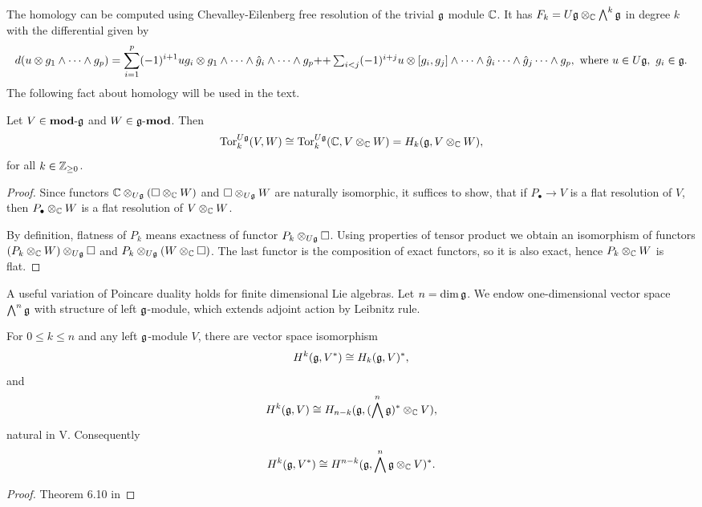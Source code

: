 The homology can be computed using Chevalley-Eilenberg  free
resolution of the trivial $\mathfrak{g}$ module $\mathbb{C}$. It has $F_k=U\mathfrak{g}\otimes_{\mathbb{C}} \bigwedge^k
\mathfrak{g}$ in degree $k$ with the differential given by
\begin{equation}
    d(u\otimes g_1 \wedge \cdots \wedge g_p) 
 = \sum_{i = 1}^p (-1)^{i+1} u g_i \otimes g_1 \wedge \cdots \wedge \hat{g}_i\wedge \cdots \wedge g_p  
+$$ $$+\sum_{i < j} (-1)^{i+j} u\otimes [g_i, g_j] \wedge \cdots \wedge \hat{g}_i\cdots \wedge
\hat{g}_j\cdots \wedge g_p,~\text{where } u\in U\lieg,~g_i \in \lieg.
\end{equation}
The following fact about homology will be used in the text.
\begin{lemma} \label{t:torhomology}
   Let $V \in \operatorname{\mathbf{mod-\mathfrak{g}}}$ and $W \in \operatorname{\mathbf{\mathfrak{g}-mod}}$. Then  
    \[
        \mathrm{Tor}_k^{U\mathfrak{g}}(V,W) \cong \mathrm{Tor}_k^{U\mathfrak{g}}(\mathbb{C},V\otimes_{\mathbb{C}} W) = H_k(\mathfrak{g}, V\otimes_{\mathbb{C}} W),
    \]
    for all $k\in \mathbb{Z}_{\geq 0}$.
\end{lemma}
\begin{proof}
    Since functors $\mathbb{C}\otimes_{U\mathfrak{g}}(\square \otimes_{\mathbb{C}} W)$ and $\square \otimes_{U\mathfrak{g}} W$
    are naturally isomorphic, it suffices to show, that if $P_\bullet \to V$ is a flat resolution
    of $V$, then $P_\bullet \otimes_{\mathbb{C}} W$ is a flat resolution of $V\otimes_{\mathbb{C}} W$.

    By definition, flatness of $P_k$ means exactness of functor $P_k\otimes_{U\mathfrak{g}}\square$. Using
    properties of tensor product we obtain an isomorphism of functors $(P_k\otimes_{\mathbb{C}} W)
    \otimes_{U\mathfrak{g}} \square$ and $P_k\otimes_{U\mathfrak{g}} (W \otimes_{\mathbb{C}} \square)$. The last functor
    is the composition of exact functors, so it is also exact, hence $P_k\otimes_{\mathbb{C}} W$ is flat.
\end{proof}

A useful variation of Poincare duality holds for finite dimensional Lie algebras. Let $n = \dim
\mathfrak{g}$. We endow one-dimensional vector space $\bigwedge^n \mathfrak{g}$ with structure of left
$\mathfrak{g}$-module, which extends adjoint action by Leibnitz rule. 

\begin{theorem} \label{t:poincare}
    For $0 \leq k \leq n$ and any left $\mathfrak{g}$-module $V$, there are vector space isomorphism 
    \[
        H^k(\mathfrak{g}, V^*) \cong H_k(\mathfrak{g}, V)^*,
    \]
    and
    \[
        H^k(\mathfrak{g}, V) \cong H_{n - k}(\mathfrak{g}, (\bigwedge^n \mathfrak{g})^*\otimes_{\mathbb{C}} V),
    \]
    natural in V. Consequently
    \[
        H^k(\mathfrak{g}, V^*) \cong H^{n - k}(\mathfrak{g},  \bigwedge^n \mathfrak{g}\otimes_{\mathbb{C}} V)^*. 
    \]
\end{theorem}
\begin{proof}
    Theorem 6.10 in 
\end{proof}
